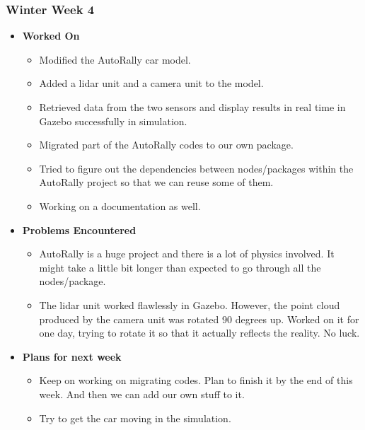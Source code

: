 \documentclass[compsoc,draftclsnofoot,onecolumn,10pt]{IEEEtran}
\begin{document}
\subsubsection{Winter Week 4}
\begin{itemize}
    \item {\textbf{Worked On}}
    \begin{itemize}
      \item Modified the AutoRally car model.
      \item Added a lidar unit and a camera unit to the model.
      \item Retrieved data from the two sensors and display
      results in real time in Gazebo successfully in simulation.
      \item Migrated part of the AutoRally codes to our own package.
      \item Tried to figure out the dependencies between nodes/packages
      within the AutoRally project so that we can reuse some of them.
      \item Working on a documentation as well.
    \end{itemize}

    \item {\textbf{Problems Encountered}}
    \begin{itemize}
      \item AutoRally is a huge project and there is a lot of physics
      involved. It might take a little bit longer than expected to go
      through all the nodes/package.
      \item The lidar unit worked flawlessly in Gazebo. However, the point
      cloud produced by the camera unit was rotated 90 degrees up. Worked
      on it for one day, trying to rotate it so that it actually reflects
      the reality. No luck.
    \end{itemize}

    \item{\textbf{Plans for next week}}
    \begin{itemize}
      \item Keep on working on migrating codes. Plan to finish it by the end
      of this week. And then we can add our own stuff to it.
      \item Try to get the car moving in the simulation.
    \end{itemize}

\end{itemize}
\end{document}
